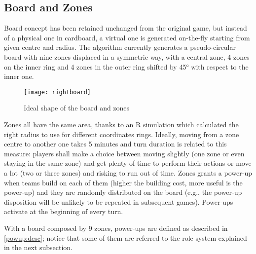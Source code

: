 		\subsection{Board and Zones}\label{design:board}
		
			Board concept has been retained unchanged from the original game, but instead of a physical one in cardboard, a virtual one is generated on-the-fly starting from given centre and radius.
			The algorithm currently generates a pseudo-circular board with nine zones displaced in a symmetric way, with a central zone, 4 zones on the inner ring and 4 zones in the outer ring shifted by 45° with respect to the inner one.
			
			\begin{figure}
				\centering
				\texttt{[image: rightboard]}
				\caption{Ideal shape of the board and zones}
			\end{figure}
			
			Zones all have the same area, thanks to an R simulation which calculated the right radius to use for different coordinates rings.
			Ideally, moving from a zone centre to another one takes 5 minutes and turn duration is related to this measure: players shall make a choice between moving slightly (one zone or even staying in the same zone) and get plenty of time to perform their actions or move a lot (two or three zones) and risking to run out of time.
			Zones grants a power-up when teams build on each of them (higher the building cost, more useful is the power-up) and they are randomly distributed on the board (e.g., the power-up disposition will be unlikely to be repeated in subsequent games).
			Power-ups activate at the beginning of every turn.
			
			With a board composed by 9 zones, power-ups are defined as described in \autoref{powup:desc}; notice that some of them are referred to the role system explained in the next subsection.
			
